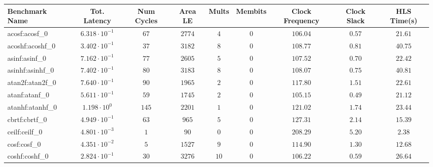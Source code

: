 \begin{tabular}{|l|c|c|c|c|c|c|c|c|}
\hline
Benchmark Name               & Tot. Latency            & Num Cycles & Area LE   & Mults   & Membits & Clock Frequency & Clock Slack & HLS Time(s) \\
\hline
acosf:acosf\_0               & $ 6.318 \cdot 10^{-1} $ & $ 67     $ & $ 2774  $ & $ 4   $ & $ 0   $ & $ 106.04      $ & $ 0.57    $ & $ 21.61   $ \\
acoshf:acoshf\_0             & $ 3.402 \cdot 10^{-1} $ & $ 37     $ & $ 3182  $ & $ 8   $ & $ 0   $ & $ 108.77      $ & $ 0.81    $ & $ 40.75   $ \\
asinf:asinf\_0               & $ 7.162 \cdot 10^{-1} $ & $ 77     $ & $ 2605  $ & $ 5   $ & $ 0   $ & $ 107.52      $ & $ 0.70    $ & $ 22.42   $ \\
asinhf:asinhf\_0             & $ 7.402 \cdot 10^{-1} $ & $ 80     $ & $ 3183  $ & $ 8   $ & $ 0   $ & $ 108.07      $ & $ 0.75    $ & $ 40.81   $ \\
atan2f:atan2f\_0             & $ 7.640 \cdot 10^{-1} $ & $ 90     $ & $ 1965  $ & $ 2   $ & $ 0   $ & $ 117.80      $ & $ 1.51    $ & $ 22.61   $ \\
atanf:atanf\_0               & $ 5.611 \cdot 10^{-1} $ & $ 59     $ & $ 1745  $ & $ 2   $ & $ 0   $ & $ 105.15      $ & $ 0.49    $ & $ 21.12   $ \\
atanhf:atanhf\_0             & $ 1.198 \cdot 10^{0}  $ & $ 145    $ & $ 2201  $ & $ 1   $ & $ 0   $ & $ 121.02      $ & $ 1.74    $ & $ 23.44   $ \\
cbrtf:cbrtf\_0               & $ 4.949 \cdot 10^{-1} $ & $ 63     $ & $ 965   $ & $ 5   $ & $ 0   $ & $ 127.31      $ & $ 2.14    $ & $ 15.39   $ \\
ceilf:ceilf\_0               & $ 4.801 \cdot 10^{-3} $ & $ 1      $ & $ 90    $ & $ 0   $ & $ 0   $ & $ 208.29      $ & $ 5.20    $ & $ 2.38    $ \\
cosf:cosf\_0                 & $ 4.351 \cdot 10^{-2} $ & $ 5      $ & $ 1527  $ & $ 9   $ & $ 0   $ & $ 114.90      $ & $ 1.30    $ & $ 12.68   $ \\
coshf:coshf\_0               & $ 2.824 \cdot 10^{-1} $ & $ 30     $ & $ 3276  $ & $ 10  $ & $ 0   $ & $ 106.22      $ & $ 0.59    $ & $ 26.64   $ \\

\end{tabular}
